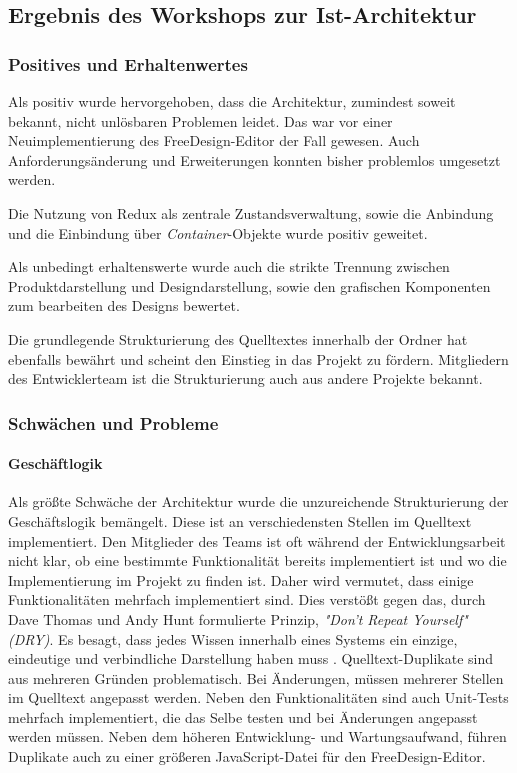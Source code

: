\subsection{Ergebnis des Workshops zur Ist-Architektur}

\subsubsection{Positives und Erhaltenwertes}

Als positiv wurde hervorgehoben, dass die Architektur, zumindest soweit bekannt, nicht unlösbaren Problemen leidet. 
Das war vor einer Neuimplementierung des FreeDesign-Editor der Fall gewesen. 
Auch Anforderungsänderung und Erweiterungen konnten bisher problemlos umgesetzt werden. 

Die Nutzung von Redux als zentrale Zustandsverwaltung, sowie die Anbindung und die Einbindung über \emph{Container}-Objekte wurde positiv geweitet. 

Als unbedingt erhaltenswerte wurde auch die strikte Trennung zwischen Produktdarstellung und Designdarstellung, sowie den grafischen Komponenten zum bearbeiten des Designs bewertet. 

Die grundlegende Strukturierung des Quelltextes innerhalb der Ordner hat ebenfalls bewährt und scheint den Einstieg in das Projekt zu fördern. 
Mitgliedern des Entwicklerteam ist die Strukturierung auch aus andere Projekte bekannt.

\subsubsection{Schwächen und Probleme}
\paragraph{Geschäftlogik}
Als größte Schwäche der Architektur wurde die unzureichende Strukturierung der Geschäftslogik bemängelt. Diese ist an verschiedensten Stellen im Quelltext implementiert. Den Mitglieder des Teams ist oft während der Entwicklungsarbeit nicht klar, ob eine bestimmte Funktionalität bereits implementiert ist und wo die Implementierung im Projekt zu finden ist. 
Daher wird vermutet, dass einige Funktionalitäten mehrfach implementiert sind. 
Dies verstößt gegen das, durch Dave Thomas und Andy Hunt formulierte Prinzip, \emph{"Don’t Repeat Yourself" (DRY)}. Es besagt, dass jedes Wissen innerhalb eines Systems ein einzige, eindeutige und verbindliche Darstellung haben muss \autocite[vgl.][30 - 31]{ThomasAndHunt2020}.  
Quelltext-Duplikate sind aus mehreren Gründen problematisch. Bei Änderungen, müssen mehrerer Stellen im Quelltext angepasst werden. Neben den Funktionalitäten sind auch Unit-Tests mehrfach implementiert, die das Selbe testen und bei Änderungen angepasst werden müssen. Neben dem höheren Entwicklung- und Wartungsaufwand, führen Duplikate auch zu einer größeren JavaScript-Datei für den FreeDesign-Editor. 

